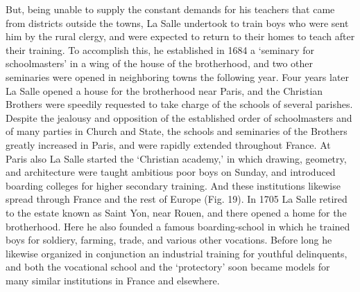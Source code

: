\documentclass[]{book}
\begin{document}
But, being unable to supply the constant demands for his teachers that came from districts outside the towns, La Salle undertook to train boys who were sent him by the rural clergy, and were expected to return to their homes to teach after their training. To accomplish this, he established in 1684 a `seminary for schoolmasters' in a wing of the house of the brotherhood, and two other seminaries were opened in neighboring towns the following year. Four years later La Salle opened a house for the brotherhood near Paris, and the Christian Brothers were speedily requested to take charge of the schools of several parishes. Despite the jealousy and opposition of the established order of schoolmasters and of many parties in Church and State, the schools and seminaries of the Brothers greatly increased in Paris, and were rapidly extended throughout France. At Paris also La Salle started the `Christian academy,' in which drawing, geometry, and architecture were taught ambitious poor boys on Sunday, and introduced boarding colleges for higher secondary training. And these institutions likewise spread through France and the rest of Europe (Fig. 19). In 1705 La Salle retired to the estate known as Saint Yon, near Rouen, and there opened a home for the brotherhood. Here he also founded a famous boarding-school in which he trained boys for soldiery, farming, trade, and various other vocations. Before long he likewise organized in conjunction an industrial training for youthful delinquents, and both the vocational school and the `protectory' soon became models for many similar institutions in France and elsewhere.
\end{document}
